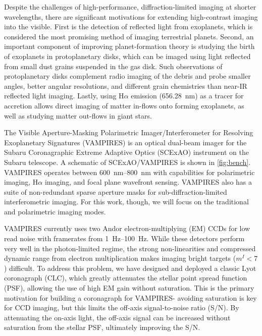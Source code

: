 \documentclass[]{spie}  %
\begin{document}
Despite the challenges of high-performance, diffraction-limited imaging at shorter wavelengths, there are significant motivations for extending high-contrast imaging into the visible. First is the detection of reflected light from exoplanets, which is considered the most promising method of imaging terrestrial planets\cite{traub2010}. Second, an important component of improving planet-formation theory is studying the birth of exoplanets in protoplanetary disks, which can be imaged using light reflected from small dust grains suspended in the gas disk. Such observations of protoplanetary disks complement radio imaging of the debris and probe smaller angles, better angular resolutions, and different grain chemistries than near-IR reflected light imaging. Lastly, using H$\alpha$ emission (\qty{656.28}{\nano\meter}) as a tracer for accretion allows direct imaging of matter in-flows onto forming exoplanets\cite{currie2022}, as well as studying matter out-flows in giant stars\cite{norris2020}.

The Visible Aperture-Masking Polarimetric Imager/Interferometer for Resolving Exoplanetary Signatures (VAMPIRES)\cite{norris2015} is an optical dual-beam imager for the Subaru Coronagraphic Extreme Adaptive Optics (SCExAO) instrument on the Subaru telescope. A schematic of SCExAO/VAMPIRES is shown in \autoref{fig:bench}. VAMPIRES operates between \qtyrange{600}{800}{\nano\meter} with capabilities for polarimetric imaging\cite{norris2020}, H$\alpha$ imaging\cite{uyama2020}, and focal plane wavefront sensing\cite{vievard2020,vievard2022,deo2022}. VAMPIRES also has a suite of non-redundant sparse aperture masks for sub-diffraction-limited interferometric imaging. For this work, though, we will focus on the traditional and polarimetric imaging modes.

VAMPIRES currently uses two Andor electron-multiplying (EM) CCDs for low read noise with framerates from \qtyrange{1}{100}{\hertz}. While these detectors perform very well in the photon-limited regime, the strong non-linearities and compressed dynamic range from electron multiplication makes imaging bright targets ($m^I < 7$) difficult. To address this problem, we have designed and deployed a classic Lyot coronagraph (CLC), which greatly attenuates the stellar point spread function (PSF), allowing the use of high EM gain without saturation. This is the primary motivation for building a coronagraph for VAMPIRES- avoiding saturation is key for CCD imaging, but this limits the off-axis signal-to-noise ratio (S/N). By attenuating the on-axis light, the off-axis signal can be increased without saturation from the stellar PSF, ultimately improving the S/N.
\end{document}
